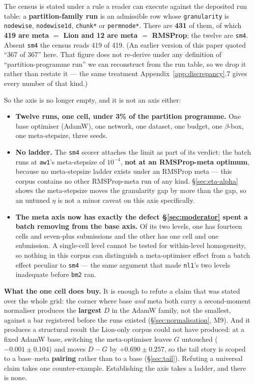 \documentclass[10pt,letterpaper]{article}
\newcommand{\Dstat}{D}                         %
\newcommand{\Gstat}{G}                         %
\newcommand{\arm}[1]{\texttt{#1}}
\begin{document}
The census is stated under a rule a reader can execute against the deposited run table: a
\textbf{partition-family run} is an admissible row whose \texttt{granularity} is \arm{nodewise},
\arm{nodewise1d}, \arm{chunk*} or \arm{permnode*}. There are \textbf{431} of them, of which
\textbf{419 are meta $=$ Lion and 12 are meta $=$ RMSProp}; the twelve are \arm{sm4}. Absent
\arm{sm4} the census reads 419 of 419. (An earlier version of this paper quoted ``367 of 367'' here.
That figure does not re-derive under any definition of ``partition-programme run'' we can
reconstruct from the run table, so we drop it rather than restate it --- the same treatment
Appendix~\ref{app:discrepancy}.7 gives every number of that kind.)

So the axis is no longer empty, and it is not an axis either:

\begin{itemize}
\item \textbf{Twelve runs, one cell, under 3\% of the partition programme.} One base optimiser
  (AdamW), one network, one dataset, one budget, one $\beta$-box, one meta-stepsize, three seeds.
\item \textbf{No ladder.} The \arm{sm4} scorer attaches the limit as part of its verdict: the
  batch runs at \arm{aw1}'s meta-stepsize of $10^{-4}$, \textbf{not at an RMSProp-meta optimum},
  because no meta-stepsize ladder exists under an RMSProp meta --- this corpus contains no other
  RMSProp-meta run of any kind. \S\ref{sec:eta-alpha} shows the meta-stepsize moves the
  granularity gap by more than the gap, so an untuned $\eta$ is not a minor caveat on this axis
  specifically.
\item \textbf{The meta axis now has exactly the defect \S\ref{sec:moderator} spent a batch
  removing from the base axis.} Of its two levels, one has fourteen cells and seven-plus
  submissions and the other has one cell and one submission. A single-cell level cannot be tested
  for within-level homogeneity, so nothing in this corpus can distinguish a meta-optimiser effect
  from a batch effect peculiar to \arm{sm4} --- the same argument that made \arm{nl1}'s two levels
  inadequate before \arm{bm2} ran.
\end{itemize}

\textbf{What the one cell does buy.} It is enough to refute a claim that was stated over the whole
grid: the corner where base \emph{and} meta both carry a second-moment normaliser produces the
\textbf{largest} $\Dstat$ in the AdamW family, not the smallest, against a bar registered before
the runs existed (\S\ref{sec:normalisation}, M9). And it produces a structural result the
Lion-only corpus could not have produced: at a fixed AdamW base, switching the meta-optimiser
leaves $\Gstat$ untouched ($-0.001 \pm 0.104$) and moves $\Dstat - \Gstat$ by $+0.690 \pm 0.257$,
so the tail story is scoped to a base--meta \textbf{pairing} rather than to a base
(\S\ref{sec:tail}). Refuting a universal claim takes one counter-example. Establishing the axis
takes a ladder, and there is none.
\end{document}
